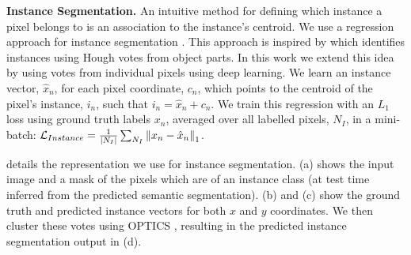 \textbf{Instance Segmentation.}
An intuitive method for defining which instance a pixel belongs to is an association to the instance's centroid.
We use a regression approach for instance segmentation \citep{liang2015proposal}. This approach is inspired by \citep{leibe2008robust} which identifies instances using Hough votes from object parts. In this work we extend this idea by using votes from individual pixels using deep learning. We learn an instance vector, $\hat{x}_n$, for each pixel coordinate, $c_n$, which points to the centroid of the pixel's instance, $i_n$, such that $i_n=\hat{x}_n+c_n$. We train this regression with an $L_1$ loss using ground truth labels $x_n$, averaged over all labelled pixels, $N_I$, in a mini-batch: $\mathcal{L}_{Instance} = \frac{1}{|N_I|} \sum_{N_I} \left\lVert x_n - \hat{x}_n \right\rVert_1$.

 details the representation we use for instance segmentation. (a) shows the input image and a mask of the pixels which are of an instance class (at test time inferred from the predicted semantic segmentation). (b) and (c) show the ground truth and predicted instance vectors for both $x$ and $y$ coordinates. We then cluster these votes using OPTICS \citep{ankerst1999optics}, resulting in the predicted instance segmentation output in (d).

